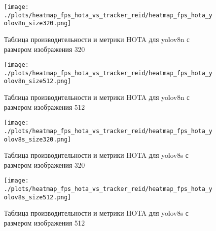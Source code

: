\begin{figure}[ht]
  \centering
  \texttt{[image: ./plots/heatmap\_fps\_hota\_vs\_tracker\_reid/heatmap\_fps\_hota\_yolov8n\_size320.png]}
  \caption{Таблица производительности и метрики HOTA для yolov8n с размером изображения 320}
  \label{fig:fps_hota_n320}
\end{figure}

\begin{figure}[ht]
  \centering
  \texttt{[image: ./plots/heatmap\_fps\_hota\_vs\_tracker\_reid/heatmap\_fps\_hota\_yolov8n\_size512.png]}
  \caption{Таблица производительности и метрики HOTA для yolov8n с размером изображения 512}
  \label{fig:fps_hota_n512}
\end{figure}


\begin{figure}[ht]
  \centering
  \texttt{[image: ./plots/heatmap\_fps\_hota\_vs\_tracker\_reid/heatmap\_fps\_hota\_yolov8s\_size320.png]}
  \caption{Таблица производительности и метрики HOTA для yolov8s с размером изображения 320}
  \label{fig:fps_hota_s320}
\end{figure}

\begin{figure}[ht]
  \centering
  \texttt{[image: ./plots/heatmap\_fps\_hota\_vs\_tracker\_reid/heatmap\_fps\_hota\_yolov8s\_size512.png]}
  \caption{Таблица производительности и метрики HOTA для yolov8s с размером изображения 512}
  \label{fig:fps_hota_s512}
\end{figure}
\FloatBarrier
